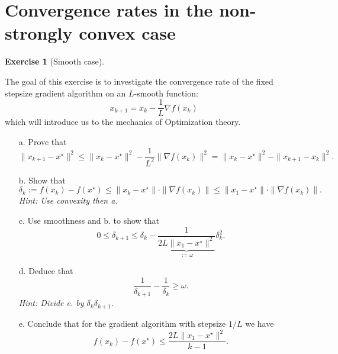 \documentclass[a4paper,twoside,10pt]{amsart}
\numberwithin{equation}{section} %
\numberwithin{figure}{section} %
\numberwithin{table}{section} %
\theoremstyle{definition}
\newtheorem{q_td}{Exercise }
\begin{document}
\vspace*{0.5cm}


\section{Convergence rates in the non-strongly convex case}
\vspace*{0.5cm}


\begin{q_td}[Smooth case]\label{td:smooth}\hfill


The goal of this exercise is to investigate the convergence rate of the fixed stepsize gradient algorithm on an $L$-smooth function:
$$ x_{k+1} = x_k - \frac{1}{L} \nabla f(x_k)$$
which will introduce us to the mechanics of Optimization theory.
\begin{itemize}
\item[a.]  Prove that 
$$ \|x_{k+1} - x^\star \|^2 \leq \|x_k - x^\star \|^2 -  \frac{1}{L^2} \| \nabla f(x_k) \|^2 = \|x_k - x^\star \|^2 -  \| x_{k+1} - x_k \|^2  .$$
\item[b.]  Show that 
$$ \delta_k := f(x_k) - f(x^\star) \leq \|x_k - x^\star \| \cdot \|\nabla f(x_k) \| \leq \|x_1 - x^\star \| \cdot \|\nabla f(x_k) \| .$$
\emph{Hint: Use convexity then a.}
\item[c.] Use smoothness and b. to show that 
$$ 0 \leq \delta_{k+1} \leq \delta_k - \underbrace{\frac{1}{2L\|x_1-x^\star\|^2}}_{:=\omega}  \delta_k^2 .   $$
\item[d.]  Deduce that 
$$ \frac{1}{\delta_{k+1}} -  \frac{1}{\delta_{k}} \geq \omega .$$
\emph{Hint: Divide c. by $ \delta_{k}\delta_{k+1} $}.
\item[e.]  Conclude that for the gradient algorithm with stepsize $1/L$ we have 
$$ f(x_k) - f(x^\star) \leq \frac{2L\|x_1-x^\star\|^2}{k-1} . $$
\end{itemize}
\end{q_td}



\newpage
\end{document}
